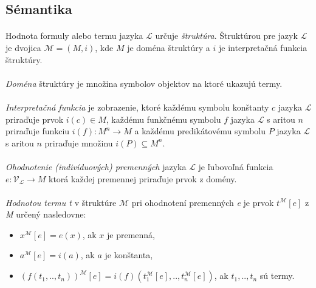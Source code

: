 \subsection{Sémantika}
\paragraph{}
Hodnota formuly alebo termu jazyka $\mathcal{L}$ určuje \emph{štruktúra}. Štruktúrou pre jazyk $\mathcal{L}$ je dvojica $\mathcal{M} = (M, i)$, kde $M$ je doména štruktúry a $i$ je interpretačná funkcia štruktúry.

\paragraph{}
\emph{Doména} štruktúry je množina symbolov objektov na ktoré ukazujú termy.

\paragraph{}
\emph{Interpretačná funkcia} je zobrazenie, ktoré každému symbolu konštanty $c$ jazyka $\mathcal{L}$ priraďuje prvok $i(c) \in M$, každému funkčnému symbolu $f$ jazyka $\mathcal{L}$ s aritou $n$ priraďuje funkciu $i(f): M^n \to M$ a každému predikátovému symbolu $P$ jazyka $\mathcal{L}$ s aritou $n$ priraďuje množinu $i(P) \subseteq M^n$.

\paragraph{}
\emph{Ohodnotenie (indivíduových) premenných} jazyka $\mathcal{L}$ je ľubovoľná funkcia $e: \mathcal{V}_\mathcal{L} \to M$ ktorá každej premennej priraďuje prvok z domény.

\paragraph{}
\emph{Hodnotou termu t} v štruktúre $\mathcal{M}$ pri ohodnotení premenných \emph{e} je prvok $t^\mathcal{M}[e]$ z \emph{M} určený nasledovne:
\begin{itemize}
	\item $x^\mathcal{M}[e] = e(x)$, ak $x$ je premenná,
	\item $a^\mathcal{M}[e] = i(a)$, ak $a$ je konštanta,
	\item $(f(t_1, .., t_n))^\mathcal{M}[e] = i(f)(t_1^\mathcal{M}[e], .., t_n^\mathcal{M}[e])$, ak $t_1, .., t_n$ sú termy.
\end{itemize}

